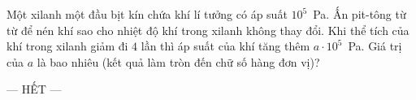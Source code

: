 	\begin{ex}%
		Một xilanh một đầu bịt kín chứa khí lí tưởng có áp suất $10^5$~Pa. Ấn pit-tông từ từ để nén khí sao cho nhiệt độ khí trong xilanh không thay đổi. Khi thể tích của khí trong xilanh giảm đi $4$ lần thì áp suất của khí tăng thêm $a\cdot 10^5$~Pa. Giá trị của $a$ là bao nhiêu (kết quả làm tròn đến chữ số hàng đơn vị)?
		\par
	\end{ex}

	\centerline{--- HẾT ---}


